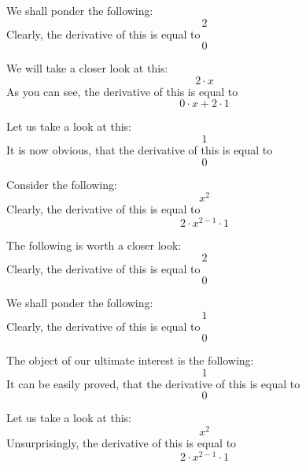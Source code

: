 \documentclass{article}
\begin{document}
We shall ponder the following:
\begin{equation}
2 
\end{equation}
Clearly, the derivative of this is equal to
\begin{equation}
0 
\end{equation}

We will take a closer look at this:
\begin{equation}
2 \cdot x 
\end{equation}
As you can see, the derivative of this is equal to
\begin{equation}
0 \cdot x + 2 \cdot 1 
\end{equation}

Let us take a look at this:
\begin{equation}
1 
\end{equation}
It is now obvious, that the derivative of this is equal to
\begin{equation}
0 
\end{equation}

Consider the following:
\begin{equation}
x ^{2 } 
\end{equation}
Clearly, the derivative of this is equal to
\begin{equation}
2 \cdot x ^{2 - 1 } \cdot 1 
\end{equation}

The following is worth a closer look:
\begin{equation}
2 
\end{equation}
Clearly, the derivative of this is equal to
\begin{equation}
0 
\end{equation}

We shall ponder the following:
\begin{equation}
1 
\end{equation}
Clearly, the derivative of this is equal to
\begin{equation}
0 
\end{equation}

The object of our ultimate interest is the following:
\begin{equation}
1 
\end{equation}
It can be easily proved, that the derivative of this is equal to
\begin{equation}
0 
\end{equation}

Let us take a look at this:
\begin{equation}
x ^{2 } 
\end{equation}
Unsurprisingly, the derivative of this is equal to
\begin{equation}
2 \cdot x ^{2 - 1 } \cdot 1 
\end{equation}
\end{document}
